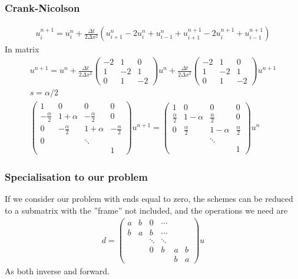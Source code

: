 \documentclass[11pt,a4paper,draft]{article}
\numberwithin{equation}{section}
\begin{document}
\subsubsection{Crank-Nicolson}
\begin{gather}
u_i^{n+1} = u_i^n + \frac{\Delta t}{2\Delta x^2}\left(
u_{i+1}^n - 2u_i^n + u_{i-1}^n + u_{i+1}^{n+1} - 2u_i^{n+1} + u_{i-1}^{n+1}
\right)
\end{gather}
In matrix
\begin{gather}
u^{n+1} = u^n + \frac{\Delta t}{2\Delta x^2}
\begin{pmatrix}
-2 & 1 & 0\\
1 & -2 & 1\\
0 & 1 & -2
\end{pmatrix} u^n
 + \frac{\Delta t}{2\Delta x^2}
\begin{pmatrix}
-2 & 1 & 0\\
1 & -2 & 1\\
0 & 1 & -2
\end{pmatrix}u^{n+1}\\
s = \alpha/2\\
\begin{pmatrix}
1 & 0 & 0 & 0\\
-\frac{\alpha}{2} & 1 + \alpha & -\frac{\alpha}{2} & 0\\
0 & -\frac{\alpha}{2} & 1 + \alpha & -\frac{\alpha}{2}\\
0 & & \ddots\\
&&& 1
\end{pmatrix}
u^{n+1} = 
\begin{pmatrix}
1 & 0 & 0 & 0\\
\frac{\alpha}{2} & 1 - \alpha & \frac{\alpha}{2} &  0\\
0 & \frac{\alpha}{2} & 1 - \alpha & \frac{\alpha}{2}\\
&& \ddots\\
&&&1
\end{pmatrix}u^n
\end{gather}


\subsubsection{Specialisation to our problem}

If we consider our problem with ends equal to zero, the schemes can 
be reduced to a submatrix with the ''frame'' not included,
and the operations we need are 
\begin{gather}
d = 
\begin{pmatrix}
a & b & 0 & \cdots\\
b & a & b & \cdots\\
&&\ddots & \ddots\\
&&0& b& a & b\\
&&&&b&a
\end{pmatrix}u
\end{gather}
As both inverse and forward.
\end{document}
